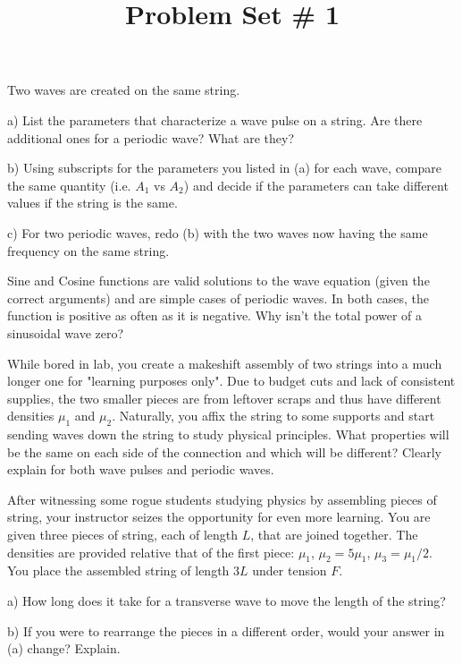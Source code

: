 \documentclass[10pt]{article}
\newenvironment{problem}[2][Problem]{\begin{trivlist}
\item[\hskip \labelsep {\bfseries #1}\hskip \labelsep {\bfseries #2.}]}{\end{trivlist}}
\begin{document}
 \title{Problem Set \# 1}
\date{}
\maketitle
 
\begin{problem}{1}
Two waves are created on the same string.
\item
a) List the parameters that characterize a wave pulse on a string. Are there additional ones for a periodic wave? What are they?
\item
b) Using subscripts for the parameters you listed in (a) for each wave, compare the same quantity (i.e. $A_1$ vs $A_2$) and decide if the parameters can take different values if the string is the same.
\item
c) For two periodic waves, redo (b) with the two waves now having the same frequency on the same string.
\end{problem}

\begin{problem}{2}
Sine and Cosine functions are valid solutions to the wave equation (given the correct arguments) and are simple cases of periodic waves. In both cases, the function is positive as often as it is negative. Why isn't the total power of a sinusoidal wave zero?
\end{problem}

\begin{problem}{3}
While bored in lab, you create a makeshift assembly of two strings into a much longer one for "learning purposes only". Due to budget cuts and lack of consistent supplies, the two smaller pieces are from leftover scraps and thus have different densities $\mu_1$ and $\mu_2$. Naturally, you affix the string to some supports and start sending waves down the string to study physical principles. What properties will be the same on each side of the connection and which will be different? Clearly explain for both wave pulses and periodic waves.
\end{problem}

\begin{problem}{4}
After witnessing some rogue students studying physics by assembling pieces of string, your instructor seizes the opportunity for even more learning.  You are given three pieces of string, each of length $L$, that are joined together. The densities are provided relative that of the first piece: $\mu_1$, $\mu_2=5\mu_1$, $\mu_3=\mu_1/2$. You place the assembled string of length $3L$ under tension $F$.
\item
a) How long does it take for a transverse wave to move the length of the string?
\item
b) If you were to rearrange the pieces in a different order, would your answer in (a) change? Explain.
\end{problem}
\end{document}
